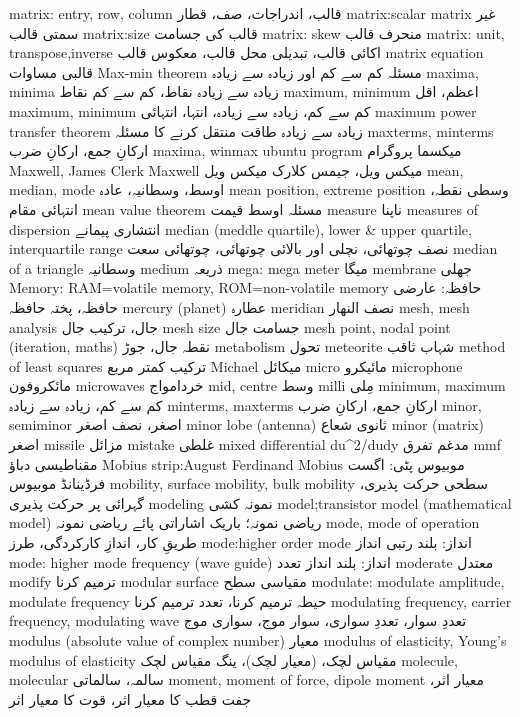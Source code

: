 matrix: entry, row, column	قالب، اندراجات، صف، قطار
matrix:scalar matrix	غیر سمتی قالب
matrix:size	قالب کی جسامت
matrix: skew	منحرف قالب
matrix: unit, transpose,inverse	اکائی قالب، تبدیلی محل قالب، معکوس قالب
matrix equation	قالبی مساوات
Max-min theorem	مسئلہ کم سے کم اور زیادہ سے زیادہ
maxima, minima	زیادہ سے زیادہ نقاط، کم سے کم نقاط
maximum, minimum	اعظم، اقل
maximum, minimum	کم سے کم، زیادہ سے زیادہ، انتہا، انتہائی
maximum power transfer theorem	زیادہ سے زیادہ طاقت منتقل کرنے کا مسئلہ
maxterms, minterms	ارکانِ جمع، ارکانِ ضرب
maxima, winmax ubuntu program	میکسما پروگرام
Maxwell, James Clerk Maxwell	میکس ویل، جیمس کلارک میکس ویل
mean, median, mode	اوسط، وسطانیہ، عادہ
mean position, extreme position	وسطی نقطہ، انتہائی مقام
mean value theorem	مسئلہ اوسط قیمت
measure	ناپنا
measures of dispersion	انتشاری پیمانے
median (meddle quartile), lower & upper quartile, interquartile range	نصف چوتھائی، نچلی اور بالائی چوتھائی، چوتھائی سعت
median of a triangle	وسطانیہ
medium	ذریعہ
mega: mega meter	میگا
membrane	جھلی
Memory: RAM=volatile memory, ROM=non-volatile memory	حافظہ: عارضی حافظہ، پختہ حافظہ
mercury (planet)	عطارہ
meridian	نصف النھار
mesh, mesh analysis	جال، ترکیب جال
mesh size	جسامت جال
mesh point, nodal point (iteration, maths)	نقطہ جال، جوڑ
metabolism	تحول
meteorite	شہاب ثاقب
method of least squares	ترکیب کمتر مربع
Michael	میکائل
micro	مائیکرو
microphone	مائکروفون
microwaves	خردامواج
mid, centre	وسط
milli	مِلی
minimum, maximum	کم سے کم، زیادہ سے زیادہ
minterms, maxterms	ارکانِ جمع، ارکانِ ضرب
minor, semiminor	اصغر، نصف اصغر
minor lobe (antenna)	ثانوی شعاع
minor (matrix)	اصغر
missile	مزائل
mistake	غلطی
mixed differential du^2/dudy	مدغم تفرق
mmf	مقناطیسی دباؤ
Mobius strip:August Ferdinand Mobius	موبیوس پٹی: اگست فرڈینانڈ موبیوس
mobility, surface mobility, bulk mobility	سطحی حرکت پذیری، گہرائی پر حرکت پذیری
modeling	نمونہ کشی
model;transistor model (mathematical model)	ریاضی نمونہ؛ باریک اشاراتی پائے ریاضی نمونہ
mode, mode of operation	طریقِ کار، اندازِ کارکردگی، طرز
mode:higher order mode	انداز: بلند رتبی انداز
mode: higher mode frequency (wave guide)	انداز: بلند انداز تعدد
moderate	معتدل
modify	ترمیم کرنا
modular surface	مقیاسی سطح
modulate: modulate amplitude, modulate frequency	حیطہ ترمیم کرنا، تعدد ترمیم کرنا
modulating frequency, carrier frequency, modulating wave	تعددِ سوار، تعددِ سواری، سوار موج، سواری موج
modulus (absolute value of complex number)	معیار
modulus of elasticity, Young's modulus of elasticity	مقیاس لچک، (معیار لچک)، ینگ مقیاس لچک
molecule, molecular	سالمہ، سالماتی
moment, moment of force, dipole moment	معیار اثر، جفت قطب کا معیار اثر، قوت کا معیار اثر
